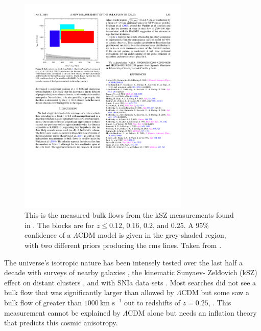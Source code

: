 \documentclass[apj, iop]{emulateapj}
\newcommand{\sn}{SNIa}
\newcommand{\lcdm}{$\Lambda$CDM}     %
\newcommand{\kms}{\ensuremath{~\text{km s}^{-1}}}
\begin{document}
\begin{figure}
	\includegraphics[width=3.2in]{Kashlinsky2010.pdf} 
    \caption{This is the measured bulk flows from the kSZ measurements found in 
    \cite{Kashlinsky10}. The blocks are for $z \leq 0.12$, $0.16$, $0.2$, and 
    $0.25$. A 95\% confidence of a \lcdm{} model is given in the grey-shaded 
    region, with two different priors producing the rms lines.
    Taken from \cite{Kashlinsky10}.}
	\label{f:ksz} 
\end{figure}

The universe's isotropic nature has been intensely tested over the last half a
decade with surveys of nearby galaxies \citep{Ma13,Wiltshire:2013dl},
the kinematic Sunyaev- Zel\'{d}ovich (kSZ) effect on distant clusters
\citep{Kashlinsky10,Planckdf}, and with \sn{} data sets \citep[and
others]{Dai11,Feindt13,Rathaus13}. Most searches did not see a bulk flow that
was significantly larger than allowed by \lcdm{} but some saw a bulk flow of
greater than $1000 \kms{}$ out to redshifts of $z = 0.25$, . This
measurement cannot be explained by $\Lambda$CDM alone but needs an inflation
theory that predicts this cosmic anisotropy.
\end{document}
